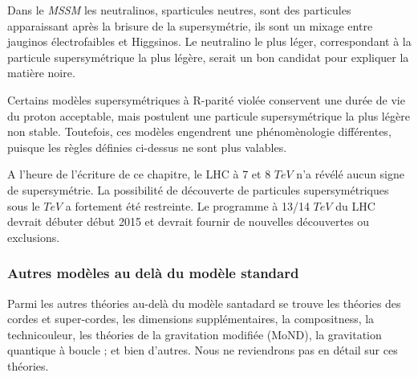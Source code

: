   \medskip
  
  
  Dans le \textit{MSSM} les neutralinos, sparticules neutres, sont des particules apparaissant apr\`es la brisure de la supersymétrie, ils sont un mixage entre jauginos \'electrofaibles et Higgsinos. Le neutralino le plus l\'eger, correspondant \`a la particule supersym\'etrique la plus l\'eg\`ere, serait un bon candidat pour expliquer la mati\`ere noire. 
  
  \medskip
  
  Certains mod\`eles supersym\'etriques \`a R-parit\'e viol\'ee conservent une dur\'ee de vie du proton acceptable, mais postulent une particule supersymétrique la plus l\'eg\`ere non stable. Toutefois, ces mod\`eles engendrent une ph\'enom\`enologie diff\'erentes, puisque les r\`egles d\'efinies ci-dessus ne sont plus valables.
  
  \medskip
  
  A l'heure de l'écriture de ce chapitre, le LHC \`a 7 et 8 $TeV$ n'a r\'ev\'el\'e aucun signe de supersymétrie. La possibilit\'e de d\'ecouverte de particules supersym\'etriques sous le $TeV$ a fortement \'et\'e restreinte. Le programme \`a 13/14 $TeV$ du LHC devrait débuter début 2015 et devrait fournir de nouvelles d\'ecouvertes ou exclusions.
  
  \subsubsection{Autres mod\`eles au del\`a du mod\`ele standard}
  
  Parmi les autres th\'eories au-delà du mod\`ele santadard se trouve les th\'eories des cordes et super-cordes, les dimensions suppl\'ementaires, la compositness, la technicouleur, les th\'eories de la gravitation modifi\'ee (MoND), la gravitation quantique \`a boucle ; et bien d'autres. Nous ne reviendrons pas en d\'etail sur ces th\'eories.
  

